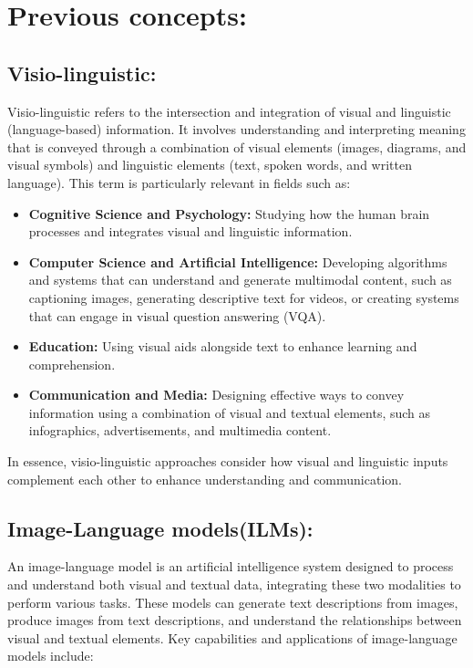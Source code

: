 \section{Previous concepts:}

\subsection{Visio-linguistic:}
Visio-linguistic refers to the intersection and integration of visual and linguistic (language-based) information. It involves understanding and interpreting meaning that is conveyed through a combination of visual elements (images, diagrams, and visual symbols) and linguistic elements (text, spoken words, and written language). This term is particularly relevant in fields such as:

\begin{itemize}
\item \textbf{Cognitive Science and Psychology:} Studying how the human brain processes and integrates visual and linguistic information.
\item \textbf{Computer Science and Artificial Intelligence:} Developing algorithms and systems that can understand and generate multimodal content, such as captioning images, generating descriptive text for videos, or creating systems that can engage in visual question answering (VQA).
\item \textbf{Education:} Using visual aids alongside text to enhance learning and comprehension.
\item \textbf{Communication and Media:} Designing effective ways to convey information using a combination of visual and textual elements, such as infographics, advertisements, and multimedia content.
\end{itemize}
In essence, visio-linguistic approaches consider how visual and linguistic inputs complement each other to enhance understanding and communication.

\subsection{Image-Language models(ILMs):} \label{ilm}
An image-language model is an artificial intelligence system designed to process and understand both visual and textual data, integrating these two modalities to perform various tasks. These models can generate text descriptions from images, produce images from text descriptions, and understand the relationships between visual and textual elements. Key capabilities and applications of image-language models include:

